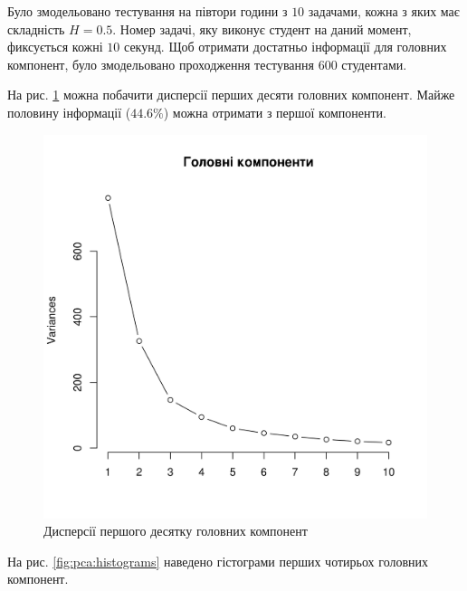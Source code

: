 Було змодельовано тестування на півтори години з $10$ задачами,
кожна з яких має складність $H=0.5$.
Номер задачі, яку виконує студент на даний момент, фиксується кожні $10$
секунд.
Щоб отримати достатньо інформації для головних компонент,
було змодельовано проходження тестування $600$ студентами.

На рис. \ref{fig:pca:main} можна побачити дисперсії перших десяти головних
компонент.
Майже половину інформації ($44.6\%$) можна отримати з першої компоненти.
\begin{figure}[h]
  \centering
    \includegraphics[width=\textwidth]{images/pca}
  \caption{Дисперсії першого десятку головних компонент}
  \label{fig:pca:main}
\end{figure}
На рис. \ref{fig:pca:histograms} наведено гістограми перших чотирьох
головних компонент.
